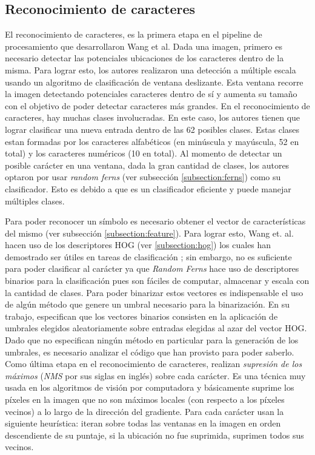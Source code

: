 \subsection{Reconocimiento de caracteres}
\label{subsection: wang_recon_caracteres}
	
	El reconocimiento de caracteres, es la primera etapa en el pipeline de procesamiento que desarrollaron Wang et al. Dada una imagen, primero es necesario detectar las potenciales ubicaciones de los caracteres dentro de la misma. Para lograr esto, los autores realizaron una detección a múltiple escala usando un algoritmo de clasificación de ventana deslizante. Esta ventana recorre la imagen detectando potenciales caracteres dentro de sí y aumenta su tamaño con el objetivo de poder detectar caracteres más grandes. En el reconocimiento de caracteres, hay muchas clases involucradas. En este caso, los autores tienen que lograr clasificar una nueva entrada dentro de las 62 posibles clases. Estas clases estan formadas por los caracteres alfabéticos (en minúscula y mayúscula, 52 en total) y los caracteres numéricos (10 en total). Al momento de detectar un posible carácter en una ventana, dada la gran cantidad de clases, los autores optaron por usar \textit{random ferns} (ver subsección \ref{subsection:ferns}) como su clasificador. Esto es debido a que es un clasificador eficiente y puede manejar múltiples clases.
	
	Para poder reconocer un símbolo es necesario obtener el vector de características del mismo (ver subsección \ref{subsection:feature}). Para lograr esto, Wang et. al. hacen uso de los descriptores HOG (ver \ref{subsection:hog}) los cuales han demostrado ser útiles en tareas de clasificación \cite{DT05}; sin embargo, no es suficiente para poder clasificar al carácter ya que \textit{Random Ferns} hace uso de descriptores binarios para la clasificación pues son fáciles de computar, almacenar y escala con la cantidad de clases. Para poder binarizar estos vectores es indispensable el uso de algún método que genere un umbral necesario para la binarización. En su trabajo, especifican que los vectores binarios consisten en la aplicación de umbrales elegidos aleatoriamente sobre entradas elegidas al azar del vector HOG. Dado que no especifican ningún método en particular para la generación de los umbrales, es necesario analizar el código que han provisto para poder saberlo. Como última etapa en el reconocimiento de caracteres, realizan \textit{supresión de los máximos} (\textit{NMS} por sus siglas en inglés) sobre cada carácter. Es una técnica muy usada en los algoritmos de visión por computadora  y básicamente suprime los píxeles en la imagen que no son máximos locales (con respecto a los píxeles vecinos) a lo largo de la dirección del gradiente. Para cada carácter  usan la siguiente heurística: iteran sobre todas las ventanas en la imagen en orden descendiente de su puntaje, si la ubicación no fue suprimida, suprimen todos sus vecinos.
	
